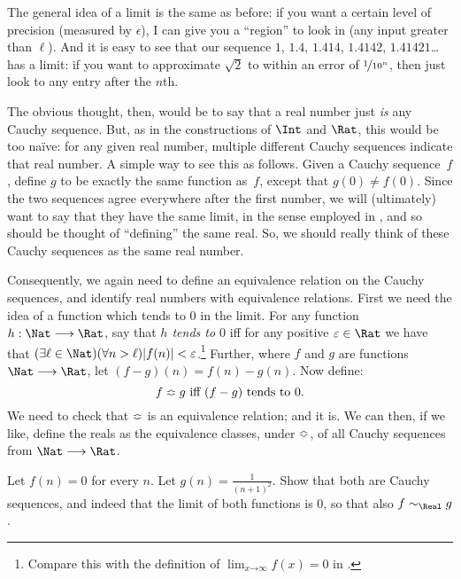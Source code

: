\documentclass[../../../include/open-logic-section]{subfiles}
\begin{document}
The general idea of a limit is the same as before: if you want a
certain level of precision (measured by $\epsilon$), I can give you a
``region'' to look in (any input greater than $\ell$). And it is easy
to see that our sequence $1$, $1.4$, $1.414$, $1.4142$,
$1.41421$\ldots has a limit: if you want to approximate $\sqrt{2}$ to
within an error of $\nicefrac{1}{10^{n}}$, then just look to any entry
after the $n$th.

The obvious thought, then, would be to say that a real number just
\emph{is} any Cauchy sequence. But, as in the constructions of $\Int$
and $\Rat$, this would be too na\"{i}ve: for any given real number,
multiple different Cauchy sequences indicate that real number. A
simple way to see this as follows. Given a Cauchy sequence~$f$, define
$g$ to be exactly the same function as~$f$, except that $g(0)\neq
f(0)$. Since the two sequences agree everywhere after the first
number, we will (ultimately) want to say that they have the same
limit, in the sense employed in ,
and so should be thought of ``defining'' the same real. So, we should
really think of these Cauchy sequences as the same real number.

Consequently, we again need to define an equivalence relation on the
Cauchy sequences, and identify real numbers with equivalence
relations. First we need the idea of a function which tends to $0$ in
the limit. For any function $h : \Nat \to \Rat$, say that \emph{$h$
tends to $0$} iff for any positive $\epsilon \in \Rat$ we have that
$(\exists \ell \in \Nat)(\forall n > \ell)|f(n)| <
\epsilon$.\footnote{Compare this with the definition of $\lim_{x
\mathord{\rightarrow}\infty}f(x) = 0$ in
.} Further, where $f$ and $g$ are
functions $\Nat \to \Rat$, let $(f-g)(n) = f(n) - g(n)$. Now define:
\[
	f \Bumpeq g \text{ iff $(f-g)$ tends to $0$}.
\]
We need to check that $\Bumpeq$ is an equivalence relation; and it
is. We can then, if we like, define the reals as the equivalence
classes, under $\Bumpeq$, of all Cauchy sequences from $\Nat \to
\Rat$.

\begin{prob}
Let $f(n) = 0$ for every $n$. Let $g(n) = \frac{1}{(n+1)^2}$. Show
that both are Cauchy sequences, and indeed that the limit of both
functions is $0$, so that also $f \sim_\Real g$. 
\end{prob}
\end{document}
